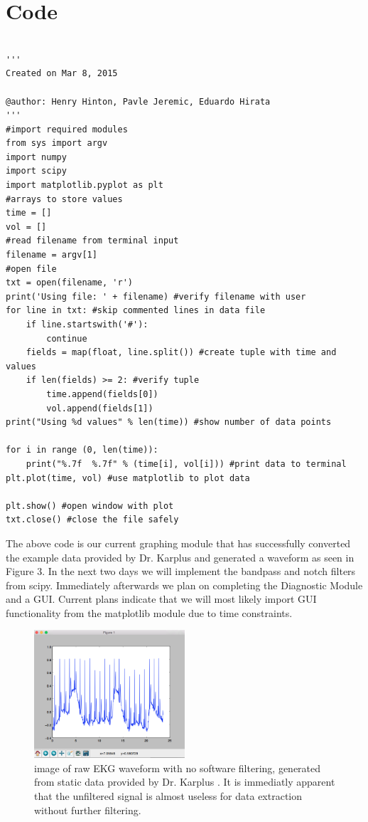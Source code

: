\documentclass[11pt, oneside]{article}   	%
\begin{document}
\section{Code}
\begin{lstlisting}

'''
Created on Mar 8, 2015

@author: Henry Hinton, Pavle Jeremic, Eduardo Hirata
'''
#import required modules
from sys import argv
import numpy
import scipy
import matplotlib.pyplot as plt
#arrays to store values
time = []
vol = []
#read filename from terminal input
filename = argv[1]
#open file
txt = open(filename, 'r')
print('Using file: ' + filename) #verify filename with user
for line in txt: #skip commented lines in data file
    if line.startswith('#'):
        continue
    fields = map(float, line.split()) #create tuple with time and values
    if len(fields) >= 2: #verify tuple
        time.append(fields[0])
        vol.append(fields[1])
print("Using %d values" % len(time)) #show number of data points

for i in range (0, len(time)):
    print("%.7f  %.7f" % (time[i], vol[i])) #print data to terminal
plt.plot(time, vol) #use matplotlib to plot data

plt.show() #open window with plot
txt.close() #close the file safely
\end{lstlisting}
\pagebreak
\par The above code is our current graphing module that has successfully converted the example data provided by Dr. Karplus \cite{karptalk} and generated a waveform as seen in Figure 3. In the next two days we will implement the bandpass and notch filters from scipy. Immediately afterwards we plan on completing the Diagnostic Module and a GUI. Current plans indicate that we will most likely import GUI functionality from the matplotlib module due to time constraints.

\begin{figure}
	\includegraphics[width=0.5\textwidth]{matplotlib1}
	\caption{image of raw EKG waveform with no software filtering, generated from static data provided by Dr. Karplus \cite{karptalk}. It is immediatly apparent that the unfiltered signal is almost useless for data extraction without further filtering.}
\end{figure}
\end{document}
